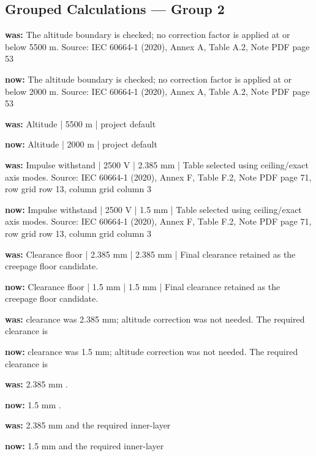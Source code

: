 \documentclass[10pt]{article}
\begin{document}
\subsection*{Grouped Calculations — Group 2}
\textbf{was:} The altitude boundary is checked; no correction factor is applied at or below 5500 m. Source: IEC 60664-1 (2020), Annex A, Table A.2, Note PDF page 53\par
\textbf{now:} The altitude boundary is checked; no correction factor is applied at or below 2000 m. Source: IEC 60664-1 (2020), Annex A, Table A.2, Note PDF page 53\par
\textbf{was:} Altitude | 5500 m | project default\par
\textbf{now:} Altitude | 2000 m | project default\par
\textbf{was:} Impulse withstand | 2500 V | 2.385 mm | Table selected using ceiling/exact axis modes. Source: IEC 60664-1 (2020), Annex F, Table F.2, Note PDF page 71, row grid row 13, column grid column 3\par
\textbf{now:} Impulse withstand | 2500 V | 1.5 mm | Table selected using ceiling/exact axis modes. Source: IEC 60664-1 (2020), Annex F, Table F.2, Note PDF page 71, row grid row 13, column grid column 3\par
\textbf{was:} Clearance floor | 2.385 mm | 2.385 mm | Final clearance retained as the creepage floor candidate.\par
\textbf{now:} Clearance floor | 1.5 mm | 1.5 mm | Final clearance retained as the creepage floor candidate.\par
\textbf{was:} clearance was 2.385 mm; altitude correction was not needed. The required clearance is\par
\textbf{now:} clearance was 1.5 mm; altitude correction was not needed. The required clearance is\par
\textbf{was:} 2.385 mm .\par
\textbf{now:} 1.5 mm .\par
\textbf{was:} 2.385 mm and the required inner-layer\par
\textbf{now:} 1.5 mm and the required inner-layer\par
\end{document}
